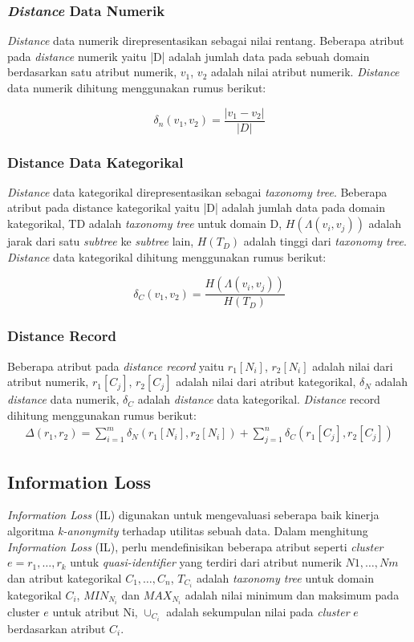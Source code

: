 \subsubsection{\textit{Distance} Data Numerik}
\textit{Distance} data numerik direpresentasikan sebagai nilai rentang. Beberapa atribut pada \textit{distance} numerik yaitu |D| adalah jumlah data pada sebuah domain berdasarkan satu atribut numerik, $v_1$, $v_2$ adalah nilai atribut numerik. \textit{Distance} data numerik dihitung menggunakan rumus berikut:

\begin{equation}
\delta_n(v_1,v_2) = \frac{|v_1 - v_2|}{|D|} 
\end{equation}

\subsubsection{Distance Data Kategorikal}
\textit{Distance} data kategorikal direpresentasikan sebagai \textit{taxonomy tree}. Beberapa atribut pada distance kategorikal yaitu |D| adalah jumlah data pada domain kategorikal, TD adalah \textit{taxonomy tree} untuk domain D,  $H(\Lambda(v_i,v_j))$ adalah jarak dari satu \textit{subtree} ke \textit{subtree} lain, $H(T_D)$ adalah tinggi dari \textit{taxonomy tree}. \textit{Distance} data kategorikal dihitung menggunakan rumus berikut:

\begin{equation}
\delta_C(v_1,v_2) = \frac{H(\Lambda(v_i,v_j))}{H(T_D)} 
\end{equation}

\subsubsection{Distance Record}
Beberapa atribut pada \textit{distance record} yaitu $r_1[N_i]$, $r_2[N_i]$ adalah nilai dari atribut numerik, $r_1[C_j]$, $r_2[C_j]$ adalah nilai dari atribut kategorikal, $\delta_N$ adalah \textit{distance} data numerik, $\delta_C$ adalah \textit{distance} data kategorikal. \textit{Distance} record dihitung menggunakan rumus berikut:
\begin{align}
\Delta (r_1,r_2) = \sum_{i=1}^{m} \delta_N(r_1[N_i],r_2	[N_i]) +  \sum_{j=1}^{n} \delta_C(r_1[C_j],r_2[C_j])
\end{align}


\subsection{Information Loss}
\textit{Information Loss} (IL) digunakan untuk mengevaluasi seberapa baik kinerja algoritma \textit{k-anonymity} terhadap utilitas sebuah data. Dalam menghitung \textit{Information Loss} (IL), perlu mendefinisikan beberapa atribut seperti \textit{cluster} $e = {r_1,\ldots,r_k}$  untuk \textit{quasi-identifier} yang terdiri dari atribut numerik ${N1,\ldots, Nm}$ dan atribut kategorikal ${C_1,\ldots,C_n}$, $T_{C_i}$ adalah \textit{taxonomy tree} untuk domain kategorikal $C_i$, $MIN_{N_i}$ dan $MAX_{N_i}$ adalah nilai minimum dan maksimum pada cluster $e$ untuk atribut Ni, $\cup_{C_i}$ adalah sekumpulan nilai pada \textit{cluster} $e$ berdasarkan atribut $C_i$. \\

